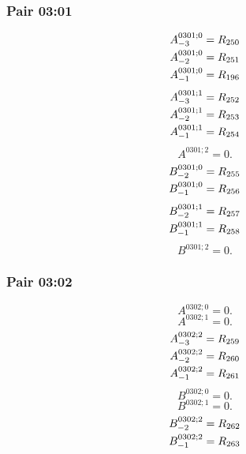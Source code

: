 \documentclass[11pt,a4paper]{article}
\begin{document}
\subsubsection{Pair 03:01}
\begin{equation}
\shortstack[l]{$\displaystyle A^{0301;0}_{-3}=R_{250}$\\
$\displaystyle A^{0301;0}_{-2}=R_{251}$\\
$\displaystyle A^{0301;0}_{-1}=R_{196}$}
\label{eq:cat-map-222}
\end{equation}
\begin{equation}
\shortstack[l]{$\displaystyle A^{0301;1}_{-3}=R_{252}$\\
$\displaystyle A^{0301;1}_{-2}=R_{253}$\\
$\displaystyle A^{0301;1}_{-1}=R_{254}$}
\label{eq:cat-map-223}
\end{equation}
\begin{equation}
A^{0301;2}=0.
\label{eq:cat-map-224}
\end{equation}
\begin{equation}
\shortstack[l]{$\displaystyle B^{0301;0}_{-2}=R_{255}$\\
$\displaystyle B^{0301;0}_{-1}=R_{256}$}
\label{eq:cat-map-225}
\end{equation}
\begin{equation}
\shortstack[l]{$\displaystyle B^{0301;1}_{-2}=R_{257}$\\
$\displaystyle B^{0301;1}_{-1}=R_{258}$}
\label{eq:cat-map-226}
\end{equation}
\begin{equation}
B^{0301;2}=0.
\label{eq:cat-map-227}
\end{equation}
\subsubsection{Pair 03:02}
\begin{equation}
A^{0302;0}=0.
\label{eq:cat-map-228}
\end{equation}
\begin{equation}
A^{0302;1}=0.
\label{eq:cat-map-229}
\end{equation}
\begin{equation}
\shortstack[l]{$\displaystyle A^{0302;2}_{-3}=R_{259}$\\
$\displaystyle A^{0302;2}_{-2}=R_{260}$\\
$\displaystyle A^{0302;2}_{-1}=R_{261}$}
\label{eq:cat-map-230}
\end{equation}
\begin{equation}
B^{0302;0}=0.
\label{eq:cat-map-231}
\end{equation}
\begin{equation}
B^{0302;1}=0.
\label{eq:cat-map-232}
\end{equation}
\begin{equation}
\shortstack[l]{$\displaystyle B^{0302;2}_{-2}=R_{262}$\\
$\displaystyle B^{0302;2}_{-1}=R_{263}$}
\label{eq:cat-map-233}
\end{equation}
\end{document}
